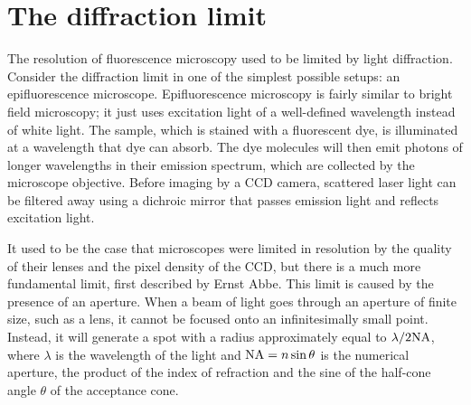 \section{The diffraction limit}

The resolution of fluorescence microscopy used to be limited by light diffraction. Consider the diffraction limit in one of the simplest possible setups: an epifluorescence microscope. Epifluorescence microscopy is fairly similar to bright field microscopy; it just uses excitation light of a well-defined wavelength instead of white light. The sample, which is stained with a fluorescent dye, is illuminated at a wavelength that dye can absorb. The dye molecules will then emit photons of longer wavelengths in their emission spectrum, which are collected by the microscope objective. Before imaging by a CCD camera, scattered laser light can be filtered away using a dichroic mirror that passes emission light and reflects excitation light. 


It used to be the case that microscopes were limited in resolution by the quality of their lenses and the pixel density of the CCD, but there is a much more fundamental limit, first described by Ernst Abbe. This limit is caused by the presence of an aperture. When a beam of light goes through an aperture of finite size, such as a lens, it cannot be focused onto an infinitesimally small point. Instead, it will generate a spot with a radius approximately equal to $ \lambda/2\mathrm{NA} $, where $ \lambda $ is the wavelength of the light and $ \mathrm{NA}= n\sin\theta $ is the numerical aperture, the product of the index of refraction and the sine of the half-cone angle $ \theta $ of the acceptance cone.

